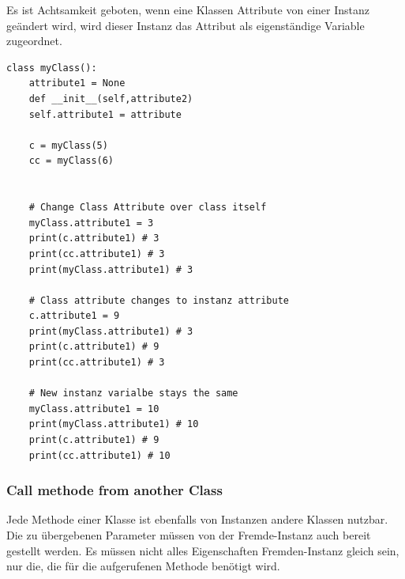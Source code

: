 Es ist Achtsamkeit geboten, wenn eine Klassen Attribute von einer Instanz geändert wird, wird dieser Instanz das Attribut als eigenständige Variable zugeordnet.

\begin{lstlisting}[style=python]
	class myClass():
	attribute1 = None
	def __init__(self,attribute2)
	self.attribute1 = attribute	
	
	c = myClass(5)
	cc = myClass(6)
	
	
	# Change Class Attribute over class itself
	myClass.attribute1 = 3
	print(c.attribute1) # 3
	print(cc.attribute1) # 3
	print(myClass.attribute1) # 3
	
	# Class attribute changes to instanz attribute
	c.attribute1 = 9
	print(myClass.attribute1) # 3
	print(c.attribute1) # 9
	print(cc.attribute1) # 3
	
	# New instanz varialbe stays the same
	myClass.attribute1 = 10
	print(myClass.attribute1) # 10
	print(c.attribute1) # 9
	print(cc.attribute1) # 10
\end{lstlisting}

\subsubsection{Call methode from another Class}
Jede Methode einer Klasse ist ebenfalls von Instanzen andere Klassen nutzbar. Die zu übergebenen Parameter müssen von der Fremde-Instanz auch bereit gestellt werden. Es müssen nicht alles Eigenschaften Fremden-Instanz gleich sein, nur die, die für die aufgerufenen Methode benötigt wird.\\

